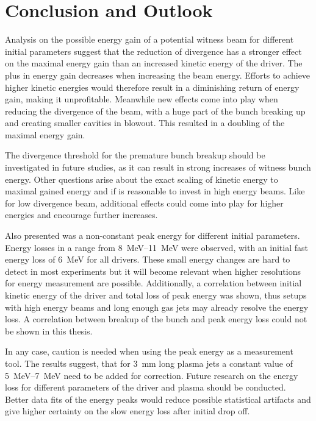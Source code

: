 \documentclass[bachelor_thesis]{subfiles}
\begin{document}
\chapter{Conclusion and Outlook} \label{chap:conclusion}
Analysis on the possible energy gain of a potential witness beam for different initial parameters suggest that the reduction of divergence has a stronger effect on the maximal energy gain than an increased kinetic energy of the driver.
The plus in energy gain decreases when increasing the beam energy. Efforts to achieve higher kinetic energies would therefore result in a diminishing return of energy gain, making it unprofitable. 
Meanwhile new effects come into play when reducing the divergence of the beam, with a huge part of the bunch breaking up and creating smaller cavities in blowout. This resulted in a doubling of the maximal energy gain.

The divergence threshold for the premature bunch breakup should be investigated in future studies, as it can result in strong increases of witness bunch energy.
Other questions arise about the exact scaling of kinetic energy to maximal gained energy and if is reasonable to invest in high energy beams. Like for low divergence beam, additional effects could come into play for higher energies and encourage further increases.




Also presented was a non-constant peak energy for different initial parameters. Energy losses in a range from \qtyrange{8}{11}{\MeV} were observed, with an initial fast energy loss of \qty{6}{\MeV} for all drivers.
These small energy changes are hard to detect in most experiments but it will become relevant when higher resolutions for energy measurement are possible. 
Additionally, a correlation between initial kinetic energy of the driver and total loss of peak energy was shown, thus setups with high energy beams and long enough gas jets may already resolve the energy loss.
A correlation between breakup of the bunch and peak energy loss could not be shown in this thesis.

In any case, caution is needed when using the peak energy as a measurement tool. The results suggest, that for \qty{3}{\mm} long plasma jets a constant value of \qtyrange{5}{7}{\MeV} need to be added for correction.
Future research on the energy loss for different parameters of the driver and plasma should be conducted. Better data fits of the energy peaks would reduce possible statistical artifacts and give higher certainty on the slow energy loss after initial drop off.
\end{document}
